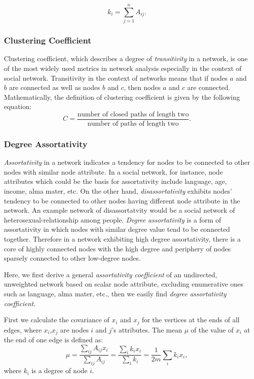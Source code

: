 \documentclass{article}
\begin{document}
	\begin{equation}
 	 k_i = \sum_{j = 1}^n A_{ij}.
	\end{equation}

	
	\subsubsection{Clustering Coefficient}
	Clustering coefficient, which describes a degree of \textit{transitivity} in a network, is one of the most widely used metrics in network analysis especially in the context of social network. Transitivity in the context of networks means that if nodes $a$ and $b$ are connected as well as nodes $b$ and $c$, then nodes $a$ and $c$ are connected. Mathematically, the definition of clustering coefficient is given by the following equation:
	\begin{equation}
	C = \frac{\text{number of closed paths of length two}}{\text{number of paths of length two}}.
	\end{equation}
	
	\subsubsection{Degree Assortativity}
	\textit{Assortativity} in a network indicates a tendency for nodes to be connected to other nodes with similar node attribute. In a social network, for instance, node attributes which could be the basis for assortativity include language, age, income, alma mater, etc. On the other hand, \textit{disassortativity} exhibits nodes' tendency to be connected to other nodes having different node attribute in the network. An example network of disassortatvity would be a social network of heterosexual-relationship among people. 
	\textit{Degree assortativity} is a form of assortativity in which nodes with similar degree value tend to be connected together. Therefore in a network exhibiting high degree assortativity, there is a core of highly connected nodes with the high degree and periphery of nodes sparsely connected to other low-degree nodes.
	
	Here, we first derive a general \textit{assortativity coefficient} of an undirected, unweighted network based on scalar node attribute, excluding enumerative ones such as language, alma mater, etc., then we easily find \textit{degree assortativity coefficient}.
	
	First we calculate the covariance of $x_i$ and $x_j$ for the vertices at the ends of all edges, where $x_i$,$x_j$ are nodes $i$ and $j$'s attributes.
	The mean $\mu$ of the value of $x_i$ at the end of one edge is defined as:
	\begin{equation}
	\mu = \frac{ \sum_{ij}A_{ij}x_i }{\sum_{ij}A_{ij}} = \frac{\sum_i k_i x_i}{\sum_i k_i} = \frac{1}{2m}\sum_i k_i x_i,
	\end{equation}
where $k_i$ is a degree of node $i$.
\end{document}
